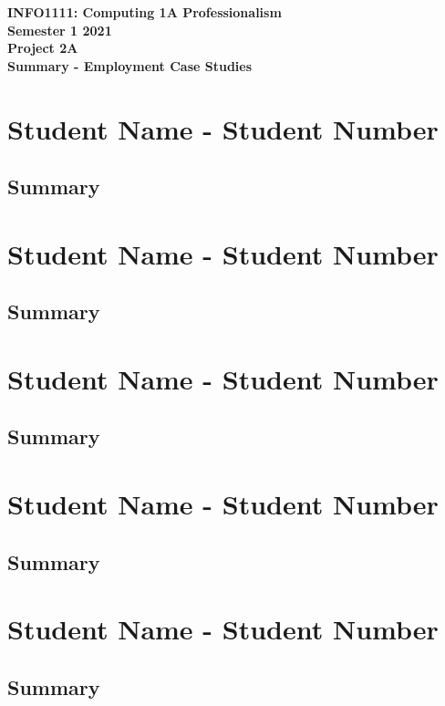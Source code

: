 \documentclass[a4paper, 11pt]{report}
\begin{document}
\begin{titlepage}
\center 
\textbf{\huge INFO1111: Computing 1A Professionalism}\\[1cm]
\textbf{\huge Semester 1 2021}\\[1cm]
\textbf{\huge Project 2A}\\[3cm]

\textbf{\huge Summary - Employment Case Studies}

\end{titlepage}

\tableofcontents


\chapter{Student Name - Student Number}
\section*{Summary}

\chapter{Student Name - Student Number}
\section*{Summary}

\chapter{Student Name - Student Number}
\section*{Summary}

\chapter{Student Name - Student Number}
\section*{Summary}

\chapter{Student Name - Student Number}
\section*{Summary}
\end{document}
